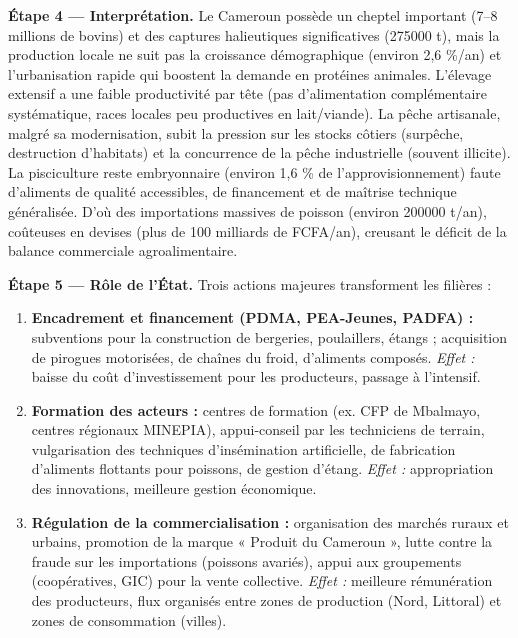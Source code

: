 \documentclass[11pt]{article}
\begin{document}
\begin{exoresolu}
\textbf{Étape 4 — Interprétation.} Le Cameroun possède un cheptel important (7--8 millions de bovins) et des captures halieutiques significatives (\num{275000} t), mais la production locale ne suit pas la croissance démographique (environ 2,6 \%/an) et l'urbanisation rapide qui boostent la demande en protéines animales. L'élevage extensif a une faible productivité par tête (pas d'alimentation complémentaire systématique, races locales peu productives en lait/viande). La pêche artisanale, malgré sa modernisation, subit la pression sur les stocks côtiers (surpêche, destruction d'habitats) et la concurrence de la pêche industrielle (souvent illicite). La pisciculture reste embryonnaire (environ 1,6 \% de l'approvisionnement) faute d'aliments de qualité accessibles, de financement et de maîtrise technique généralisée. D'où des importations massives de poisson (environ \num{200000} t/an), coûteuses en devises (plus de 100 milliards de FCFA/an), creusant le déficit de la balance commerciale agroalimentaire.

\textbf{Étape 5 — Rôle de l'État.} Trois actions majeures transforment les filières :
\begin{enumerate}
\item \textbf{Encadrement et financement (PDMA, PEA-Jeunes, PADFA) :} subventions pour la construction de bergeries, poulaillers, étangs ; acquisition de pirogues motorisées, de chaînes du froid, d'aliments composés. \emph{Effet :} baisse du coût d'investissement pour les producteurs, passage à l'intensif.
\item \textbf{Formation des acteurs :} centres de formation (ex. CFP de Mbalmayo, centres régionaux MINEPIA), appui-conseil par les techniciens de terrain, vulgarisation des techniques d'insémination artificielle, de fabrication d'aliments flottants pour poissons, de gestion d'étang. \emph{Effet :} appropriation des innovations, meilleure gestion économique.
\item \textbf{Régulation de la commercialisation :} organisation des marchés ruraux et urbains, promotion de la marque « Produit du Cameroun », lutte contre la fraude sur les importations (poissons avariés), appui aux groupements (coopératives, GIC) pour la vente collective. \emph{Effet :} meilleure rémunération des producteurs, flux organisés entre zones de production (Nord, Littoral) et zones de consommation (villes).
\end{enumerate}


\end{exoresolu}
\end{document}
